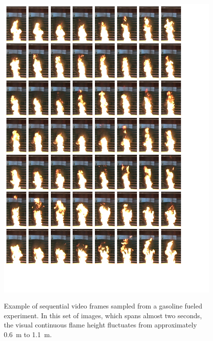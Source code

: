 \documentclass[twoside]{uocthesis}
\begin{document}
{\begin{figure}
	\centering
	\includegraphics[width=\textwidth]{../Figures/flame_height_comp_FHGAS}\\
	\caption[Example of sequential video frames sampled from a gasoline fueled experiment]{Example of sequential video frames sampled from a gasoline fueled experiment.  In this set of images, which spans almost two seconds, the visual continuous flame height fluctuates from approximately 0.6~m to 1.1~m.}
	\label{flame_height_comp_FHGAS_1}
\end{figure}

}
\end{document}
